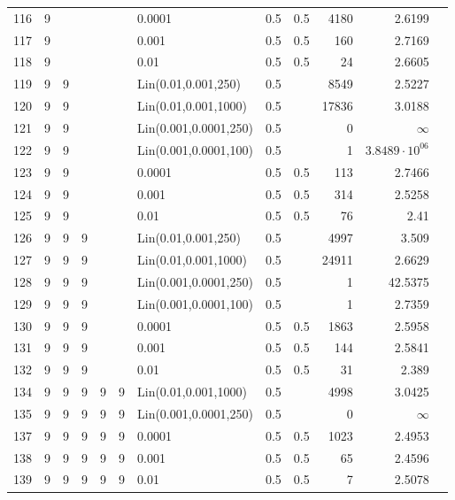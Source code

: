 \begin{longtable}{lrrrrrlrrrrr}
  116 &       9 &   &   &   &   &                0.0001 &  0.5 &    0.5 &    4180 &                 2.6199 \\
  117 &       9 &   &   &   &   &                 0.001 &  0.5 &    0.5 &     160 &                 2.7169 \\
  118 &       9 &   &   &   &   &                  0.01 &  0.5 &    0.5 &      24 &                 2.6605 \\
  119 &       9 & 9 &   &   &   &   Lin(0.01,0.001,250) &  0.5 &        &    8549 &                 2.5227 \\
  120 &       9 & 9 &   &   &   &  Lin(0.01,0.001,1000) &  0.5 &        &   17836 &                 3.0188 \\
  121 &       9 & 9 &   &   &   & Lin(0.001,0.0001,250) &  0.5 &        &       0 &               $\infty$ \\
  122 &       9 & 9 &   &   &   & Lin(0.001,0.0001,100) &  0.5 &        &       1 &  $3.8489\cdot 10^{06}$ \\
  123 &       9 & 9 &   &   &   &                0.0001 &  0.5 &    0.5 &     113 &                 2.7466 \\
  124 &       9 & 9 &   &   &   &                 0.001 &  0.5 &    0.5 &     314 &                 2.5258 \\
  125 &       9 & 9 &   &   &   &                  0.01 &  0.5 &    0.5 &      76 &                   2.41 \\
  126 &       9 & 9 & 9 &   &   &   Lin(0.01,0.001,250) &  0.5 &        &    4997 &                  3.509 \\
  127 &       9 & 9 & 9 &   &   &  Lin(0.01,0.001,1000) &  0.5 &        &   24911 &                 2.6629 \\
  128 &       9 & 9 & 9 &   &   & Lin(0.001,0.0001,250) &  0.5 &        &       1 &                42.5375 \\
  129 &       9 & 9 & 9 &   &   & Lin(0.001,0.0001,100) &  0.5 &        &       1 &                 2.7359 \\
  130 &       9 & 9 & 9 &   &   &                0.0001 &  0.5 &    0.5 &    1863 &                 2.5958 \\
  131 &       9 & 9 & 9 &   &   &                 0.001 &  0.5 &    0.5 &     144 &                 2.5841 \\
  132 &       9 & 9 & 9 &   &   &                  0.01 &  0.5 &    0.5 &      31 &                  2.389 \\
  134 &       9 & 9 & 9 & 9 & 9 &  Lin(0.01,0.001,1000) &  0.5 &        &    4998 &                 3.0425 \\
  135 &       9 & 9 & 9 & 9 & 9 & Lin(0.001,0.0001,250) &  0.5 &        &       0 &               $\infty$ \\
  137 &       9 & 9 & 9 & 9 & 9 &                0.0001 &  0.5 &    0.5 &    1023 &                 2.4953 \\
  138 &       9 & 9 & 9 & 9 & 9 &                 0.001 &  0.5 &    0.5 &      65 &                 2.4596 \\
  139 &       9 & 9 & 9 & 9 & 9 &                  0.01 &  0.5 &    0.5 &       7 &                 2.5078 \\
\end{longtable}
